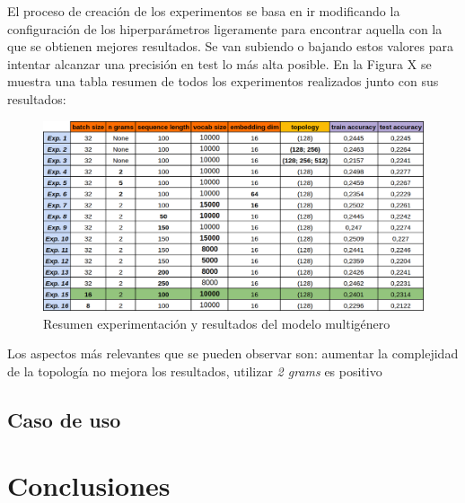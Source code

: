 \documentclass[12pt,a4paper, xcolor=table]{article}
\begin{document}
\vspace{2mm}

El proceso de creación de los experimentos se basa en ir modificando la configuración de los hiperparámetros ligeramente para encontrar aquella con la que se obtienen mejores resultados. Se van subiendo o bajando estos valores para intentar alcanzar una precisión en test lo más alta posible. En la Figura X se muestra una tabla resumen de todos los experimentos realizados junto con sus resultados:

\begin{figure}[!h]
    \centering
    \includegraphics[width=500px]{img/multi.png}
    \caption{Resumen experimentación y resultados del modelo multigénero}
\end{figure}

Los aspectos más relevantes que se pueden observar son: aumentar la complejidad de la topología no mejora los resultados, utilizar \textit{2 grams} es positivo 





\subsection{Caso de uso}




\section{Conclusiones}

\clearpage



\end{document}
